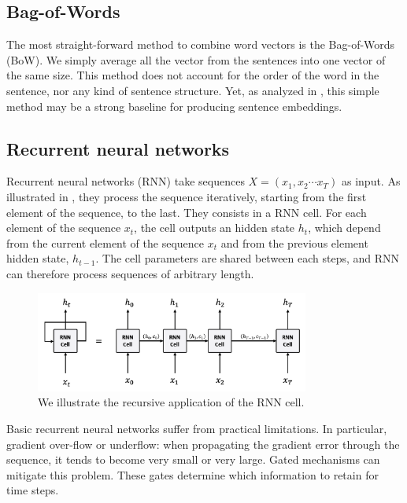 
\subsection{Bag-of-Words}

The most straight-forward method to combine word vectors is the Bag-of-Words (BoW). We simply average all the vector from the sentences into one vector of the same size. This method does not account for the order of the word in the sentence, nor any kind of sentence structure. Yet, as analyzed in \textcite{arora_17}, this simple method may be a strong baseline for producing sentence embeddings.

\subsection{Recurrent neural networks}

Recurrent neural networks (RNN) \parencite{hochreiter_97, cho_14} take sequences $X = (x_1, x_2 \cdots x_T)$ as input. As illustrated in , they process the sequence iteratively, starting from the first element of the sequence, to the last. They consists in a RNN cell. For each element of the sequence $x_t$, the cell outputs an hidden state $h_t$, which depend from the current element of the sequence $x_t$ and from the previous element hidden state, $h_{t-1}$. The cell parameters are shared between each steps, and RNN can therefore process sequences of arbitrary length.

\begin{figure}[!ht]
	\includegraphics[width=9cm]{images/rnn_cell_unfold.png}
	\caption[RNN cell unfold]{We illustrate the recursive application of the RNN cell.}
\end{figure}

Basic recurrent neural networks suffer from practical limitations. In particular, gradient over-flow or underflow: when propagating the gradient error through the sequence, it tends to become very small or very large.  Gated mechanisms can mitigate this problem. These gates determine which information to retain for time steps.

